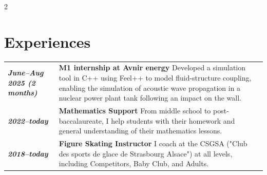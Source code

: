 \documentclass[lighthipster]{latex_for_CV/simplehipstercv}
\begin{document}
\begin{paracol}{2}
\vspace{1em}



\small
\section*{Experiences}

\begin{tabular}{>{\raggedleft\arraybackslash}p{2.5cm} | >{\footnotesize}p{} c}
    \textit{{\textbf{\color{gray!130} June--Aug 2025 (2 months)}}} & {\small\textbf{M1 internship at Avnir energy}} \newline Developed a simulation tool in C++ using Feel++ to model fluid-structure coupling, enabling the simulation of acoustic wave propagation in a nuclear power plant tank following an impact on the wall.  & \\[1.05cm]
    \textit{{\textbf{\color{gray!130} 2022--today}}} & {\small\textbf{ Mathematics Support}} \newline From middle school to post-baccalaureate, I help students with their homework and general understanding of their mathematics lessons. & \\[0.75cm]
    \textit{{\textbf{\color{gray!130} 2018--today}}} & {\small\textbf{ Figure Skating Instructor}} \newline I coach at the CSGSA ("Club des sports de glace de Strasbourg Alsace") at all levels, including Competitors, Baby Club, and Adults. & \\
\end{tabular}




\vfill{} %

\setlength{\parindent}{0pt}


\end{paracol}
\end{document}

